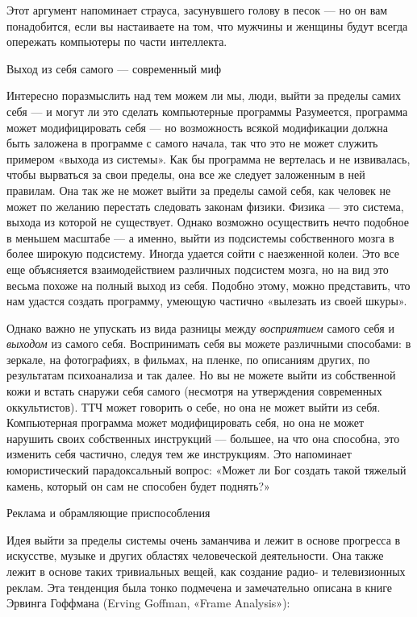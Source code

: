 Этот аргумент напоминает страуса, засунувшего голову в песок --- но он вам понадобится, если вы настаиваете на том, что мужчины и женщины будут всегда опережать компьютеры по части интеллекта.

Выход из себя самого --- современный миф

Интересно поразмыслить над тем можем ли мы, люди, выйти за пределы самих себя --- и могут ли это сделать компьютерные программы Разумеется, программа может модифицировать себя --- но возможность всякой модификации должна быть заложена в программе с самого начала, так что это не может служить примером «выхода из системы». Как бы программа не вертелась и не извивалась, чтобы вырваться за свои пределы, она все же следует заложенным в ней правилам. Она так же не может выйти за пределы самой себя, как человек не может по желанию перестать следовать законам физики. Физика --- это система, выхода из которой не существует. Однако возможно осуществить нечто подобное в меньшем масштабе --- а именно, выйти из подсистемы собственного мозга в более широкую подсистему. Иногда удается сойти с наезженной колеи. Это все еще объясняется взаимодействием различных подсистем мозга, но на вид это весьма похоже на полный выход из себя. Подобно этому, можно представить, что нам удастся создать программу, умеющую частично «вылезать из своей шкуры».

Однако важно не упускать из вида разницы между \emph{восприятием} самого себя и \emph{выходом} из самого себя. Воспринимать себя вы можете различными способами: в зеркале, на фотографиях, в фильмах, на пленке, по описаниям других, по результатам психоанализа и так далее. Но вы не можете выйти из собственной кожи и встать снаружи себя самого (несмотря на утверждения современных оккультистов). ТТЧ может говорить о себе, но она не может выйти из себя. Компьютерная программа может модифицировать себя, но она не может нарушить своих собственных инструкций --- большее, на что она способна, это изменить себя частично, следуя тем же инструкциям. Это напоминает юмористический парадоксальный вопрос: «Может ли Бог создать такой тяжелый камень, который он сам не способен будет поднять?»

Реклама и обрамляющие приспособления

Идея выйти за пределы системы очень заманчива и лежит в основе прогресса в искусстве, музыке и других областях человеческой деятельности. Она также лежит в основе таких тривиальных вещей, как создание радио- и телевизионных реклам. Эта тенденция была тонко подмечена и замечательно описана в книге Эрвинга Гоффмана (Erving Goffman, «Frame Analysis»):

